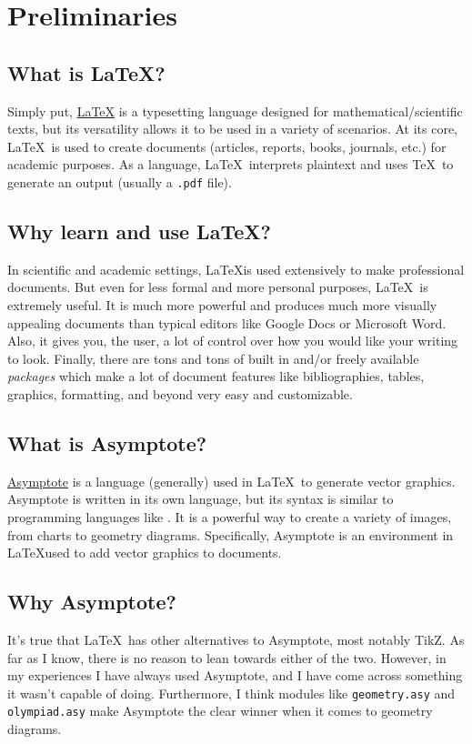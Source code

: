 \chapter{Preliminaries}
\section{What is \LaTeX?}
Simply put, \href{https://www.latex-project.org/}{\LaTeX} is a typesetting language designed for mathematical/scientific texts, but its versatility allows it to be used in a variety of scenarios. At its core, \LaTeX\ is used to create documents (articles, reports, books, journals, etc.) for academic purposes. As a language, \LaTeX\ interprets plaintext and uses \TeX\ to generate an output (usually a \texttt{.pdf} file).

\section{Why learn and use \LaTeX?}
In scientific and academic settings, \LaTeX is used extensively to make professional documents. But even for less formal and more personal purposes, \LaTeX\ is extremely useful. It is much more powerful and produces much more visually appealing documents than typical editors like Google Docs or Microsoft Word. Also, it gives you, the user, a lot of control over how you would like your writing to look. Finally, there are tons and tons of built in and/or freely available \textit{packages} which make a lot of document features like bibliographies, tables, graphics, formatting, and beyond very easy and customizable.

\section{What is Asymptote?}
\href{https://asymptote.sourceforge.io/}{Asymptote} is a language (generally) used in \LaTeX\ to generate vector graphics. Asymptote is written in its own language, but its syntax is similar to programming languages like . It is a powerful way to create a variety of images, from charts to geometry diagrams. Specifically, Asymptote is an environment in \LaTeX used to add vector graphics to documents. 

\section{Why Asymptote?}
It's true that \LaTeX\ has other alternatives to Asymptote, most notably TikZ. As far as I know, there is no reason to lean towards either of the two. However, in my experiences I have always used Asymptote, and I have come across something it wasn't capable of doing. Furthermore, I think modules like \texttt{geometry.asy} and \texttt{olympiad.asy} make Asymptote the clear winner when it comes to geometry diagrams.

